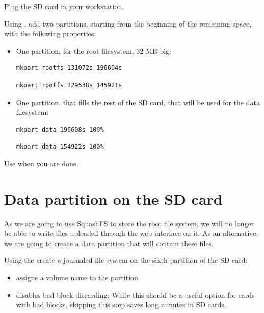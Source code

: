 Plug the SD card in your workstation.

Using , add two partitions, starting from the beginning
of the remaining space, with the following properties:
\begin{itemize}

\item One partition, for the root filesystem, 32 MB big:
\if{}
\begin{verbatim}
mkpart rootfs 131072s 196604s
\end{verbatim}
\fi
\if{}
\begin{verbatim}
mkpart rootfs 129538s 145921s
\end{verbatim}
\fi

\item One partition, that fills the rest of the SD card, that will be
  used for the data filesystem:
\if{}
\begin{verbatim}
mkpart data 196608s 100%
\end{verbatim}
\fi
\if{}
\begin{verbatim}
mkpart data 154922s 100%
\end{verbatim}
\fi
\end{itemize}

Use  when you are done.

\section{Data partition on the SD card}

As we are going to use SquashFS to store the root file system, we will no longer
be able to write files uploaded through the web interface on it. As an
alternative, we are going to create a data partition that will contain these
files.

Using the  create a journaled file system on the
sixth partition of the SD card:

\begin{itemize}
\item {} assigns a volume name to the partition
\item {} disables bad block discarding. While this
      should be a useful option for cards with bad blocks, skipping
      this step saves long minutes in SD cards.
\end{itemize}

